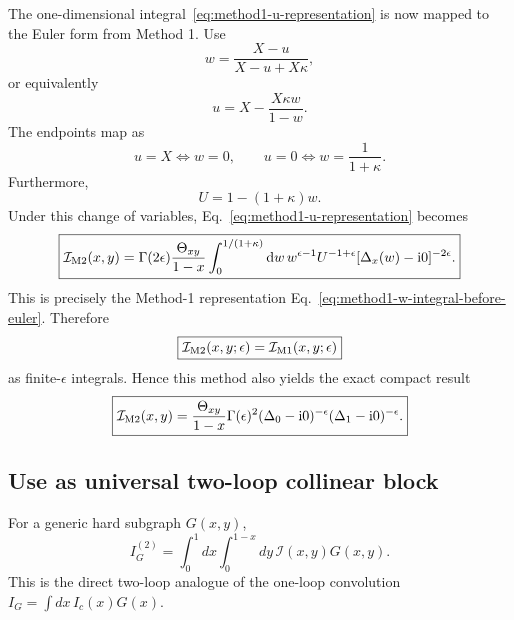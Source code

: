 \documentclass[11pt]{article}
\newcommand{\dd}{\mathrm d}
\newcommand{\ii}{\mathrm i}
\newcommand{\eps}{\epsilon}
\begin{document}
The one-dimensional integral~\eqref{eq:method1-u-representation} is now mapped to the Euler form from Method 1.  Use
\begin{equation}
 w=\frac{X-u}{X-u+X\kappa},
\label{eq:u-to-w-map}
\end{equation}
or equivalently
\begin{equation}
 u=X-\frac{X\kappa w}{1-w}.
\label{eq:w-to-u-map}
\end{equation}
The endpoints map as
\begin{equation}
 u=X \Longleftrightarrow w=0,
 \qquad
 u=0 \Longleftrightarrow w=\frac1{1+\kappa}.
\label{eq:u-w-endpoints}
\end{equation}
Furthermore,
\begin{equation}
U=1-(1+\kappa)w.
\label{eq:U-under-u-w-map}
\end{equation}
Under this change of variables, Eq.~\eqref{eq:method1-u-representation} becomes
\begin{equation}
\boxed{
\mathcal I_{\rm M2}(x,y)
=
\Gamma(2\eps)
\frac{\Theta_{xy}}{1-x}
\int_0^{1/(1+\kappa)}\dd w\,
 w^{\eps-1}U^{-1+\eps}
[\Delta_x(w)-\ii0]^{-2\eps}.
}
\label{eq:M1-to-M2-w}
\end{equation}
This is precisely the Method-1 representation Eq.~\eqref{eq:method1-w-integral-before-euler}.  Therefore
\begin{equation}
\boxed{
\mathcal I_{\rm M2}(x,y;\eps)
=
\mathcal I_{\rm M1}(x,y;\eps)
}
\label{eq:exact-match}
\end{equation}
as finite-$\eps$ integrals.  Hence this method also yields the exact compact result
\begin{equation}
\boxed{
\mathcal I_{\rm M2}(x,y)
=
\frac{\Theta_{xy}}{1-x}
\Gamma(\eps)^2
(\Delta_0-\ii0)^{-\eps}
(\Delta_1-\ii0)^{-\eps}.
}
\label{eq:M2-final-exact}
\end{equation}

\newpage

\subsection{Use as universal two-loop collinear block}
For a generic hard subgraph $G(x,y)$,
\begin{equation}
I_G^{(2)}=\int_0^1dx\int_0^{1-x}dy\,\mathcal I(x,y)G(x,y).
\label{eq:two-loop-collinear-convolution}
\end{equation}
This is the direct two-loop analogue of the one-loop convolution $I_G=\int dx\,I_c(x)G(x)$.

\newpage
\end{document}
